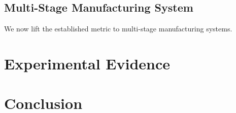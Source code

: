 \documentclass[mnsc]{informs3}
\begin{document}


\subsection{Multi-Stage Manufacturing System}
\label{subsec:Multi-Stage_Manufacturing_System}


We now lift the established metric to multi-stage manufacturing systems.


\section{Experimental Evidence}
\label{sec:Experimental_Evidence}


\section{Conclusion}
\label{sec:Conclusion}




\end{document}
